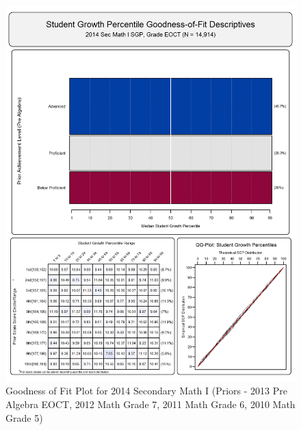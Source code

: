\documentclass[12pt]{article}
\begin{document}
\begin{figure}[htbp]
\centering
\includegraphics{../img/Goodness_of_Fit/SEC_MATH_I.2014/2014_SEC_MATH_I_EOCT;2013_PRE_ALGEBRA_EOCT;2012_MATH_7;2011_MATH_6;2010_MATH_5.png}
\caption{Goodness of Fit Plot for 2014 Secondary Math I (Priors - 2013
Pre Algebra EOCT, 2012 Math Grade 7, 2011 Math Grade 6, 2010 Math Grade
5)}
\end{figure}
\end{document}
